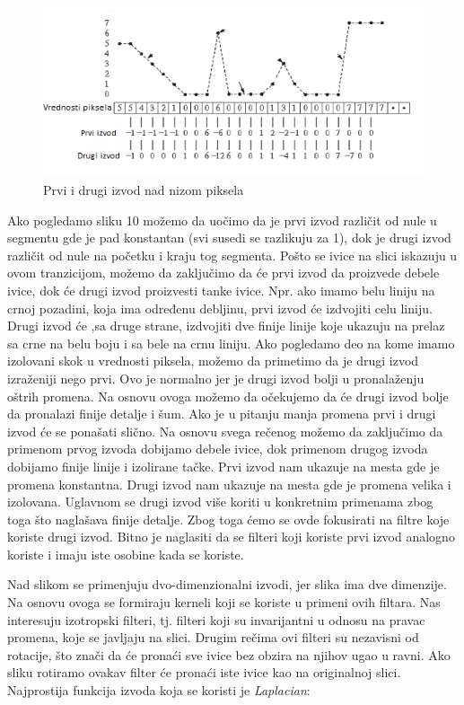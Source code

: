 \documentclass[a4paper,12pt,titlepage]{article}
\begin{document}
\begin{figure}[ht!]
\centering
\includegraphics[width=120mm]{img/izvod.png}
\caption{Prvi i drugi izvod nad nizom piksela}
\label{overflow}
\end{figure}

Ako pogledamo sliku 10 možemo da uočimo da je prvi izvod različit od nule u segmentu gde je pad konstantan (svi susedi se razlikuju za 1), dok je drugi izvod različit od nule na početku i kraju tog segmenta. Pošto se ivice na slici iskazuju u ovom tranzicijom, možemo da zaključimo da će prvi izvod da proizvede debele ivice, dok će drugi izvod proizvesti tanke ivice. Npr. ako imamo belu liniju na crnoj pozadini, koja ima određenu debljinu, prvi izvod će izdvojiti celu liniju. Drugi izvod će ,sa druge strane, izdvojiti dve finije linije koje ukazuju na prelaz sa crne na belu boju i sa bele na crnu liniju. Ako pogledamo deo na kome imamo izolovani skok u vrednosti piksela, možemo da primetimo da je drugi izvod izraženiji nego prvi. Ovo je normalno jer je drugi izvod bolji u pronalaženju oštrih promena. Na osnovu ovoga možemo da očekujemo da će drugi izvod bolje da pronalazi finije detalje i šum. Ako je u pitanju manja promena prvi i drugi izvod će se ponašati slično. Na osnovu svega rečenog možemo da zaključimo da primenom prvog izvoda dobijamo debele ivice, dok primenom drugog izvoda dobijamo finije linije i izolirane tačke. Prvi izvod nam ukazuje na mesta gde je promena konstantna. Drugi izvod nam ukazuje na mesta gde je promena velika i izolovana. Uglavnom se drugi izvod više koriti u konkretnim primenama zbog toga što naglašava finije detalje. Zbog toga ćemo se ovde fokusirati na filtre koje koriste drugi izvod. Bitno je naglasiti da se filteri koji koriste prvi izvod analogno koriste i imaju iste osobine kada se koriste.

Nad slikom se primenjuju dvo-dimenzionalni izvodi, jer slika ima dve dimenzije. Na osnovu ovoga se formiraju kerneli koji se koriste u primeni ovih filtara. Nas interesuju izotropski filteri, tj. filteri koji su invarijantni u odnosu na pravac promena, koje se javljaju na slici. Drugim rečima ovi filteri su nezavisni od rotacije, što znači da će pronaći sve ivice bez obzira na njihov ugao u ravni. Ako sliku rotiramo ovakav filter će pronaći iste ivice kao na originalnoj slici. Najprostija funkcija izvoda koja se koristi je \emph{Laplacian}:
\end{document}
